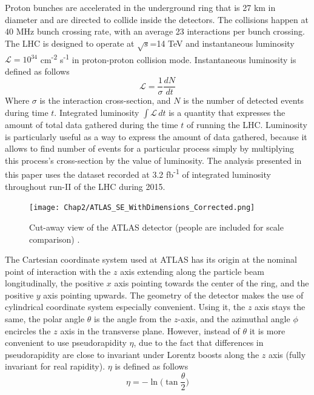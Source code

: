 Proton bunches are accelerated in the underground ring that is 27 km in diameter and are directed to collide inside the detectors. The collisions happen at 40 MHz bunch crossing rate, with an average 23 interactions per bunch crossing. The LHC is designed to operate at $\sqrt{s}$=14 TeV and instantaneous luminosity $\mathcal{L} = 10^{34}$ cm\textsuperscript{-2} s\textsuperscript{-1} in proton-proton collision mode. Instantaneous luminosity is defined as follows
\begin{equation}
\mathcal{L} = \frac{1}{\sigma}\frac{dN}{dt}
\end{equation}  
Where $\sigma$ is the interaction cross-section, and $N$ is the number of detected events during time $t$. Integrated luminosity $\int \mathcal{L}\, dt$ is a quantity that expresses the amount of total data gathered during the time $t$ of running the LHC. Luminosity  is particularly useful as a way to express the amount of data gathered, because it allows to find number of events for a particular process simply by multiplying this process's cross-section by the value of luminosity. The analysis presented in this paper uses the dataset recorded at 3.2 fb\textsuperscript{-1} of integrated luminosity throughout run-II of the LHC during 2015. 


\begin{figure}[!t]
	\centering
    \captionsetup{width=\textwidth}
	\texttt{[image: Chap2/ATLAS\_SE\_WithDimensions\_Corrected.png]}
\caption[Cut-away view of the ATLAS detector]{\label{fig:detector}  Cut-away view of the ATLAS detector (people are included for scale comparison) \citep{aad2008atlas}. }
\end{figure}

The Cartesian coordinate system used at ATLAS has its origin at the nominal point of interaction with the $z$ axis extending along the particle beam longitudinally, the positive $x$ axis pointing towards the center of the ring, and the positive $y$ axis pointing upwards. 
The geometry of the detector makes the use of cylindrical coordinate system especially convenient. Using it, the $z$ axis stays the same, the polar angle $\theta$ is the angle from the $z$-axis, and the azimuthal angle $\phi$ encircles the $z$ axis in the transverse plane. However, instead of $\theta$ it is more convenient to use pseudorapidity $\eta$, due to the fact that differences in pseudorapidity are close to invariant under Lorentz boosts along the $z$ axis (fully invariant for real rapidity). $\eta$ is defined as follows
\begin{equation}
\eta = -\ln\biggl(\tan\frac{\theta}{2}\biggr)
\end{equation}


